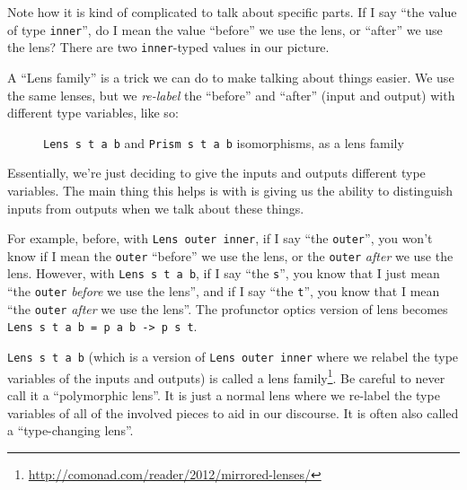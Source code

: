 \documentclass[]{article}
\renewcommand{\href}[2]{#2\footnote{\url{#1}}}
\begin{document}
Note how it is kind of complicated to talk about specific parts. If I say ``the
value of type \texttt{inner}'', do I mean the value ``before'' we use the lens,
or ``after'' we use the lens? There are two \texttt{inner}-typed values in our
picture.

A ``Lens family'' is a trick we can do to make talking about things easier. We
use the same lenses, but we \emph{re-label} the ``before'' and ``after'' (input
and output) with different type variables, like so:

\begin{figure}
\centering
{}
\caption{\texttt{Lens\ s\ t\ a\ b} and \texttt{Prism\ s\ t\ a\ b} isomorphisms,
as a lens family}
\end{figure}

Essentially, we're just deciding to give the inputs and outputs different type
variables. The main thing this helps is with is giving us the ability to
distinguish inputs from outputs when we talk about these things.

For example, before, with \texttt{Lens\textquotesingle{}\ outer\ inner}, if I
say ``the \texttt{outer}'', you won't know if I mean the \texttt{outer}
``before'' we use the lens, or the \texttt{outer} \emph{after} we use the lens.
However, with \texttt{Lens\ s\ t\ a\ b}, if I say ``the \texttt{s}'', you know
that I just mean ``the \texttt{outer} \emph{before} we use the lens'', and if I
say ``the \texttt{t}'', you know that I mean ``the \texttt{outer} \emph{after}
we use the lens''. The profunctor optics version of lens becomes
\texttt{Lens\ s\ t\ a\ b\ =\ p\ a\ b\ -\textgreater{}\ p\ s\ t}.

\texttt{Lens\ s\ t\ a\ b} (which is a version of
\texttt{Lens\textquotesingle{}\ outer\ inner} where we relabel the type
variables of the inputs and outputs) is called a
\href{http://comonad.com/reader/2012/mirrored-lenses/}{lens family}. Be careful
to never call it a ``polymorphic lens''. It is just a normal lens where we
re-label the type variables of all of the involved pieces to aid in our
discourse. It is often also called a ``type-changing lens''.
\end{document}
